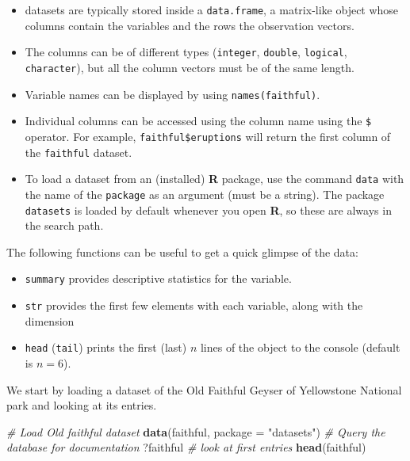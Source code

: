 \documentclass[
]{book}
\newenvironment{Shaded}{\begin{snugshade}}{\end{snugshade}}
\newcommand{\CommentTok}[1]{\textcolor[rgb]{0.56,0.35,0.01}{\textit{#1}}}
\newcommand{\DataTypeTok}[1]{\textcolor[rgb]{0.13,0.29,0.53}{#1}}
\newcommand{\KeywordTok}[1]{\textcolor[rgb]{0.13,0.29,0.53}{\textbf{#1}}}
\newcommand{\NormalTok}[1]{#1}
\newcommand{\StringTok}[1]{\textcolor[rgb]{0.31,0.60,0.02}{#1}}
\providecommand{\tightlist}{%
  \setlength{\itemsep}{0pt}\setlength{\parskip}{0pt}}
\begin{document}
\begin{itemize}
\tightlist
\item
  datasets are typically stored inside a \texttt{data.frame}, a matrix-like object whose columns contain the variables and the rows the observation vectors.
\item
  The columns can be of different types (\texttt{integer}, \texttt{double}, \texttt{logical}, \texttt{character}), but all the column vectors must be of the same length.
\item
  Variable names can be displayed by using \texttt{names(faithful)}.
\item
  Individual columns can be accessed using the column name using the \texttt{\$} operator. For example, \texttt{faithful\$eruptions} will return the first column of the \texttt{faithful} dataset.
\item
  To load a dataset from an (installed) \textbf{R} package, use the command \texttt{data} with the name of the \texttt{package} as an argument (must be a string). The package \texttt{datasets} is loaded by default whenever you open \textbf{R}, so these are always in the search path.
\end{itemize}

The following functions can be useful to get a quick glimpse of the data:

\begin{itemize}
\tightlist
\item
  \texttt{summary} provides descriptive statistics for the variable.
\item
  \texttt{str} provides the first few elements with each variable, along with the dimension
\item
  \texttt{head} (\texttt{tail}) prints the first (last) \(n\) lines of the object to the console (default is \(n=6\)).
\end{itemize}

We start by loading a dataset of the Old Faithful Geyser of Yellowstone National park and looking at its entries.

\begin{Shaded}
\begin{Highlighting}[]
\CommentTok{# Load Old faithful dataset}
\KeywordTok{data}\NormalTok{(faithful, }\DataTypeTok{package =} \StringTok{"datasets"}\NormalTok{)}
\CommentTok{# Query the database for documentation}
\NormalTok{?faithful}
\CommentTok{# look at first entries}
\KeywordTok{head}\NormalTok{(faithful)}
\end{Highlighting}
\end{Shaded}
\end{document}

